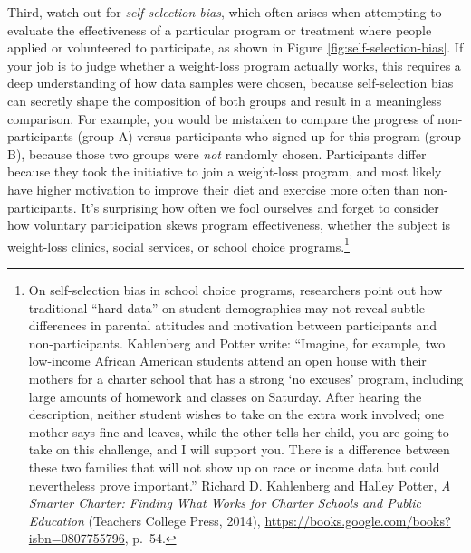 \documentclass[
  english,
]{book}
\begin{document}
Third, watch out for \emph{self-selection bias}, which often arises when attempting to evaluate the effectiveness of a particular program or treatment where people applied or volunteered to participate, as shown in Figure \ref{fig:self-selection-bias}. If your job is to judge whether a weight-loss program actually works, this requires a deep understanding of how data samples were chosen, because self-selection bias can secretly shape the composition of both groups and result in a meaningless comparison. For example, you would be mistaken to compare the progress of non-participants (group A) versus participants who signed up for this program (group B), because those two groups were \emph{not} randomly chosen. Participants differ because they took the initiative to join a weight-loss program, and most likely have higher motivation to improve their diet and exercise more often than non-participants. It's surprising how often we fool ourselves and forget to consider how voluntary participation skews program effectiveness, whether the subject is weight-loss clinics, social services, or school choice programs.\footnote{On self-selection bias in school choice programs, researchers point out how traditional ``hard data'' on student demographics may not reveal subtle differences in parental attitudes and motivation between participants and non-participants. Kahlenberg and Potter write: ``Imagine, for example, two low-income African American students attend an open house with their mothers for a charter school that has a strong `no excuses' program, including large amounts of homework and classes on Saturday. After hearing the description, neither student wishes to take on the extra work involved; one mother says fine and leaves, while the other tells her child, you are going to take on this challenge, and I will support you. There is a difference between these two families that will not show up on race or income data but could nevertheless prove important.'' Richard D. Kahlenberg and Halley Potter, \emph{A {Smarter Charter}: {Finding What Works} for {Charter Schools} and {Public Education}} ({Teachers College Press}, 2014), \url{https://books.google.com/books?isbn=0807755796}, p.~54.}
\end{document}
